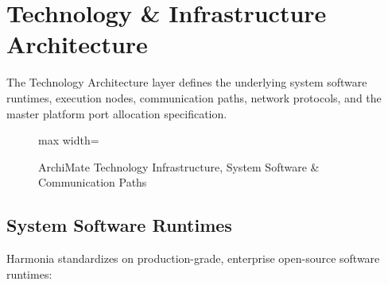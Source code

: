 
\chapter{Technology \& Infrastructure Architecture}
\label{chap:technology_layer}

The Technology Architecture layer defines the underlying system software runtimes, execution nodes, communication paths, network protocols, and the master platform port allocation specification.

\begin{figure}[htbp]
    \centering
    \begin{adjustbox}{max width=\textwidth}
        
    \end{adjustbox}
    \caption{ArchiMate Technology Infrastructure, System Software \& Communication Paths}
    \label{fig:technology_nodes}
\end{figure}

\section{System Software Runtimes}

Harmonia standardizes on production-grade, enterprise open-source software runtimes:

